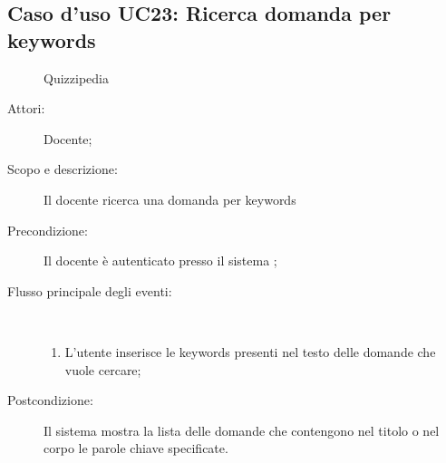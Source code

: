 \subsection{Caso d'uso UC23: Ricerca domanda per keywords}
	\begin{figure}[H]
		\centering
		\begin{resizedtikzpicture}{\textwidth}
		\begin{umlsystem}[x=0, fill=lightgray!20]{Quizzipedia}
		\end{umlsystem}
		\end{resizedtikzpicture}
		\caption{}
	\end{figure}
\begin{description}
\item[Attori:] Docente;
\item[Scopo e descrizione:] Il docente  ricerca una domanda per keywords

      \item[Precondizione:] Il docente è autenticato presso il sistema
;

        \item[Flusso principale degli eventi:] \ 
 \begin{enumerate}
          \item L'utente inserisce le keywords presenti nel testo delle domande che vuole cercare;

      \end{enumerate}
    \item[Postcondizione:] Il sistema mostra la lista delle domande che contengono nel titolo o nel corpo le parole chiave specificate.
  \end{description}
\hypertarget{UC24}{}

